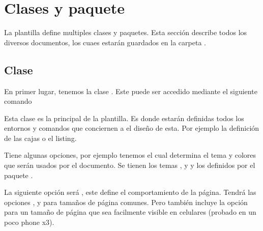 \documentclass[theme=mocha, pagecolor, pagesize=a5paper, stretchmode=true]{qx-files/qx-notes}
\title{\texpkgname{qx-files}}
\author{Qx}
\date{\today}
\begin{document}
  \maketitle




  \begin{abstract}
    El objetivo de esta plantilla es definir una serie de macros y herramientas con el objetivo de la creación de notas matemáticas o de programación de manera simple.

    Incluye varias opciones para la customización de la apariencia. También, estará modularizado, por lo que si solo se requiere una porción de los comandos, basta con cargar el paquete que lo contenga únicamente.
  \end{abstract}



  \section{Clases y paquete}

  La plantilla define multiples clases y paquetes. Esta sección describe todos los diversos documentos, los cuaes estarán guardados en la carpeta .



  \subsection{Clase }

  En primer lugar, tenemos la clase . Este puede ser accedido mediante el siguiente comando

  Esta clase es la principal de la plantilla. Es donde estarán definidas todos los entornos y comandos que conciernen a el diseño de esta. Por ejemplo la definición de las cajas o el listing.

  Tiene algunas opciones, por ejemplo tenemos  el cual determina el tema y colores que serán usados por el documento. Se tienen los temas ,  y  y los definidos por el paquete .

  La siguiente opción será , este define el comportamiento de la página. Tendrá las opciones ,  y  para tamaños de página comunes. Pero también incluye la opción  para un tamaño de página que sea facilmente visible en celulares (probado en un poco phone x3).
\end{document}
